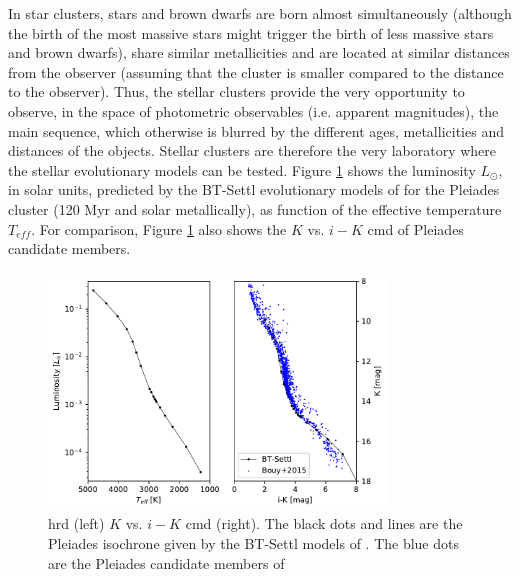 In star clusters, stars and brown dwarfs are born almost simultaneously (although the birth of the most massive stars might trigger the birth of less massive stars and brown dwarfs), share similar metallicities and are located at similar distances from the observer (assuming that the cluster is smaller compared to the distance to the observer). Thus, the stellar clusters provide the very opportunity to observe, in the space of photometric observables (i.e. apparent magnitudes), the main sequence, which otherwise is blurred by the different ages, metallicities and distances of the objects. Stellar clusters are therefore the very laboratory where the stellar evolutionary models can be tested. Figure \ref{fig:HDRvsCMD} shows the luminosity $L_{\odot}$, in solar units, predicted by the BT-Settl evolutionary models of \citep{2014IAUS..299..271A} for the Pleiades cluster (120 Myr and solar metallically), as function of the effective temperature $T_{eff}$. For comparison, Figure \ref{fig:HDRvsCMD} also shows the $K$ vs. $i-K$ \gls{cmd} of \citet{Bouy2015} Pleiades candidate members. 

\begin{figure}[htp!]
\begin{center}
\includegraphics[page=1,width=0.8\textwidth]{background/Figures/Teff_vs_phot.pdf}
\caption{\gls{hrd} (left) $K$ vs. $i-K$ \gls{cmd} (right). The black dots and lines are the Pleiades isochrone given by the BT-Settl models of \citep{2014IAUS..299..271A}. The blue dots are the Pleiades candidate members of \citet{Bouy2015}}
\label{fig:HDRvsCMD}
\end{center}
\end{figure}

